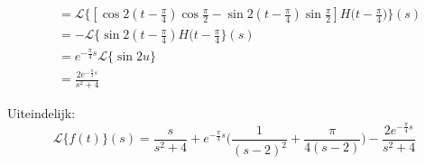 \begin{itemize}[label={}]
{{\begin{enumerate}
\begin{equation*}
\begin{split}
                                                                        & = \mathcal{L}\{[\cos 2(t - \frac{\pi}{4})\cos\frac{\pi}{2} - \sin 2(t - \frac{\pi}{4})\sin\frac{\pi}{2}]H\big(t - \frac{\pi}{4})\}(s) \\
                                                                        & = - \mathcal{L}\{\sin 2(t - \frac{\pi}{4})H(t - \frac{\pi}{4}\}(s) \\
                                                                        & = e^{-\frac{\pi}{4}s}\mathcal{L}\{\sin 2u\} \\
                                                                        & = \frac{2e^{-\frac{\pi}{4}s}}{s^2 + 4}
            \end{split}
           \end{equation*}
    \end{enumerate}
    Uiteindelijk:
    $$\mathcal{L}\{f(t)\}(s) = \frac{s}{s^2 + 4} + e^{-\frac{\pi}{4}s}\bigg(\frac{1}{(s - 2)^2} +  \frac{\pi}{4(s - 2)}\bigg) - \frac{2e^{-\frac{\pi}{4}s}}{s^2 + 4}$$
    }
 }
 
 
\end{itemize}

